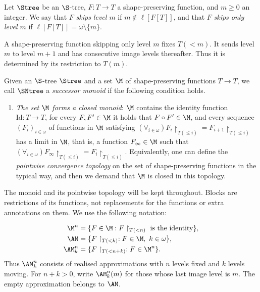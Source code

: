 \begin{definition}
	Let $\Stree$ be an $\S$-tree, $F\colon T\to T$ a shape-preserving function, and $m\geq0$ an integer. We say that $F$ \emph{skips level $m$} if $m\notin\ell[F[T]]$, and that $F$ \emph{skips only level $m$} if $\ell[F[T]]=\omega\setminus\{m\}$.
\end{definition}
A shape-preserving function skipping only level $m$ fixes $T({<}m)$.
It sends level $m$ to level $m+1$ and has consecutive image levels
thereafter. Thus it is determined by its restriction to $T(m)$.

\begin{definition}\label{def:successor-monoid}
Given an $\S$-tree $\Stree$ and a set $\M$ of shape-preserving functions
$T\to T$, we call $\SNtree$ a \emph{successor monoid} if the following
condition holds.
\begin{enumerate}[label=(M\arabic*)]
		\item\label{item:Nmonoid}
		\emph{The set $\M$ forms a closed monoid}: $\M$ contains the identity function $\mathrm{Id}\colon T\to T$,
		for every $F,F'\in \M$ it holds that $F\circ F'\in \M$, and every sequence $(F_i)_{i\in \omega}$ of functions in $\M$
		satisfying
		$(\forall_{i\in \omega})F_i\restriction_{T({\leq}i)}=F_{i+1}\restriction_{T({\leq}i)}$ has a limit in $\M$, that is, a function $F_\infty \in \M$ such that $(\forall_{i\in \omega})F_\infty\restriction_{T({\leq}i)} = F_i\restriction_{T({\leq}i)}$. Equivalently, one can define the \emph{pointwise convergence topology} on the set of shape-preserving functions in the typical way, and then we demand that $\M$ is closed in this topology.
\end{enumerate}
\end{definition}
The monoid and its pointwise topology will be kept throughout. Blocks
are restrictions of its functions, not replacements for the functions
or extra annotations on them. We use the following notation:

$$\begin{aligned}
 \M^n&=\{F\in\M:F\restriction_{T({<}n)}\text{ is the identity}\},\\
 \AM&=\{F\restriction_{T({<}k)}:F\in\M,\ k\in\omega\},\\
 \AM^n_k&=\{F\restriction_{T({<}n+k)}:F\in\M^n\}.
\end{aligned}$$
Thus $\AM^n_k$ consists of realised approximations with $n$ levels
fixed and $k$ levels moving. For $n+k>0$, write $\AM^n_k(m)$ for
those whose last image level is $m$. The empty approximation belongs
to $\AM$.

